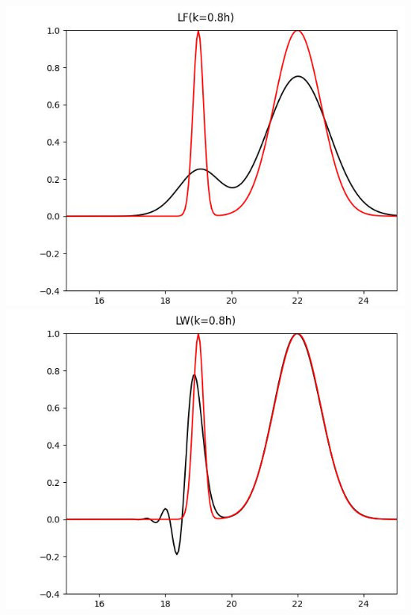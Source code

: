 \documentclass[12pt]{ctexart}
\begin{document}
\includegraphics[scale=0.52]{LF(k=0.8h).jpg}
\includegraphics[scale=0.52]{LW(k=0.8h).jpg}
\end{document}
